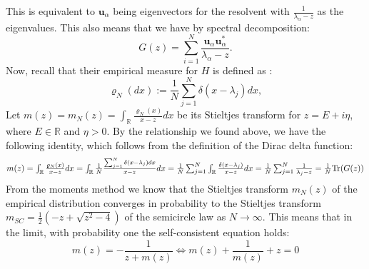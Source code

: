 \documentclass[11pt]{article}
\newcommand{\R}{\mathbb{R}}
\begin{document}
\noindent This is equivalent to $\mathbf{u}_\alpha$ being eigenvectors for the resolvent with $\frac{1}{\lambda_\alpha-z}$ as the eigenvalues. This also means that we have by spectral decomposition: 
$$G(z) =\sum_{i=1}^N \frac{\mathbf{u}_\alpha\mathbf{u}_\alpha^*}{\lambda_\alpha-z}.$$
Now, recall that their empirical measure for $H$ is defined as \cite{dynamic}: $$\varrho_N(dx):=\frac{1}{N}\sum_{j=1}^N \delta(x-\lambda_j)dx,$$
Let $m(z)=m_N(z) = \int_\R \frac{\varrho_N(x)}{x-z}dx$ be its Stieltjes transform for $z = E+i\eta$, where $E\in \R$ and $\eta>0$. By the relationship we found above, we have the following  identity, which follows from the definition of the Dirac delta function: 
\begin{equation*}\scalebox{1}{$m(z)= \int_\R \frac{\varrho_N(x)}{x-z}dx = \int_\mathbb{R} \frac{1}{N}\frac{\sum_{j=1}^N \delta(x-\lambda_j)dx}{x-z}dx = \frac{1}{N}\sum_{j=1}^N\int_\R\frac{\delta(x-\lambda_j)}{x-z}dx =\frac{1}{N} \sum_{j=1}^N \frac{1}{\lambda_j-z} = \frac{1}{N}\text{Tr}(G(z))$}\end{equation*}
From the moments method \cite{dynamic} we know that the Stieltjes transform $m_N(z)$ of the empirical distribution converges in probability to the Stieltjes transform $m_{SC} = \frac{1}{2}(-z+\sqrt{z^2-4})$ of the semicircle law as $N\rightarrow\infty$. This means that in the limit, with probability one the self-consistent equation holds: 
\label{self-consistent}
\begin{equation}
m(z) = -\frac{1}{z+m(z)} \Leftrightarrow m(z) + \frac{1}{m(z)} + z=0
\end{equation}
\end{document}
